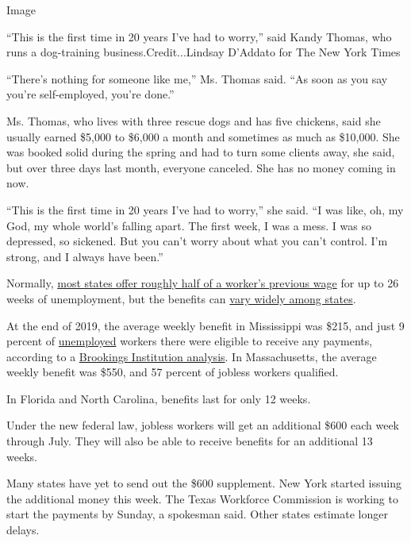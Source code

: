 Image

``This is the first time in 20 years I've had to worry,'' said Kandy
Thomas, who runs a dog-training business.Credit...Lindsay D'Addato for
The New York Times

``There's nothing for someone like me,'' Ms. Thomas said. ``As soon as
you say you're self-employed, you're done.''

Ms. Thomas, who lives with three rescue dogs and has five chickens, said
she usually earned \$5,000 to \$6,000 a month and sometimes as much as
\$10,000. She was booked solid during the spring and had to turn some
clients away, she said, but over three days last month, everyone
canceled. She has no money coming in now.

``This is the first time in 20 years I've had to worry,'' she said. ``I
was like, oh, my God, my whole world's falling apart. The first week, I
was a mess. I was so depressed, so sickened. But you can't worry about
what you can't control. I'm strong, and I always have been.''

Normally,
\href{https://www.cbpp.org/research/economy/policy-basics-how-many-weeks-of-unemployment-compensation-are-available}{most
states offer roughly half of a worker's previous wage} for up to 26
weeks of unemployment, but the benefits can
\href{https://oui.doleta.gov/unemploy/content/sigpros/2020-2029/January2020.pdf}{vary
widely among states}.

At the end of 2019, the average weekly benefit in Mississippi was \$215,
and just 9 percent of
\href{https://www.nytimes3xbfgragh.onion/2020/04/16/business/economy/unemployment-numbers-coronavirus.html}{unemployed}
workers there were eligible to receive any payments, according to a
\href{https://www.brookings.edu/blog/up-front/2020/04/07/how-does-unemployment-insurance-work-and-how-is-it-changing-during-the-coronavirus-pandemic/}{Brookings
Institution analysis}. In Massachusetts, the average weekly benefit was
\$550, and 57 percent of jobless workers qualified.

In Florida and North Carolina, benefits last for only 12 weeks.

Under the new federal law, jobless workers will get an additional \$600
each week through July. They will also be able to receive benefits for
an additional 13 weeks.

Many states have yet to send out the \$600 supplement. New York started
issuing the additional money this week. The Texas Workforce Commission
is working to start the payments by Sunday, a spokesman said. Other
states estimate longer delays.


